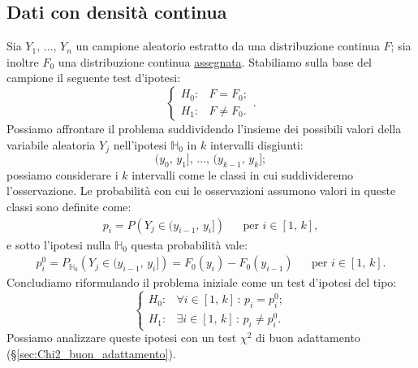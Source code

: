         \subsection{Dati con densità continua}
            \begin{defn}
                Sia $Y_1,\, \ldots,\, Y_{n}$ un campione aleatorio estratto da una distribuzione continua $F$; sia inoltre 
                $F_0$ una distribuzione continua \underline{assegnata}. Stabiliamo sulla base del campione il seguente 
                test d'ipotesi: \[
                    \begin{cases}
                        H_0 : & F = F_0; \\
                        H_1 : & F \neq F_0.
                    \end{cases}
                .\] Possiamo affrontare il problema suddividendo l'insieme dei possibili valori della variabile aleatoria 
                $Y_j$ nell'ipotesi $\mathbb{H}_0$ in $k$ intervalli disgiunti: \[
                (y_0,\,y_1],\, \ldots,\, (y_{k-1},\,y_k]
                ;\] possiamo considerare i $k$ intervalli come le classi in cui suddivideremo l'osservazione.
                Le probabilità con cui le osservazioni assumono valori in queste classi sono definite come:
                \begin{align*}
                    p_i = P\left(Y_j \in (y_{i-1},\,y_i]\right) & & \text{per } i \in [1,\,k]
                ,\end{align*}
                e sotto l'ipotesi nulla $\mathbb{H}_0$ questa probabilità vale:
                \begin{align*}
                    p_i^0 = P_{\mathbb{H}_0}\left(Y_{j} \in (y_{i-1},\,y_i]\right) = F_0(y_i) -F_0(y_{i-1})
                    & & \text{per } i \in [1,\,k]
                .\end{align*}
                Concludiamo riformulando il problema iniziale come un test d'ipotesi del tipo: \[
                    \begin{cases}
                        H_0 : & \forall i \in [1,\,k] \,:\, p_i = p_i^0; \\
                        H_1 : & \exists i \in [1,\,k] \,:\, p_i \neq p_i^0.
                    \end{cases}
                \] Possiamo analizzare queste ipotesi con un test $\chi^2$ di buon adattamento 
                (§\ref{sec:Chi2_buon_adattamento}).
            \end{defn}
